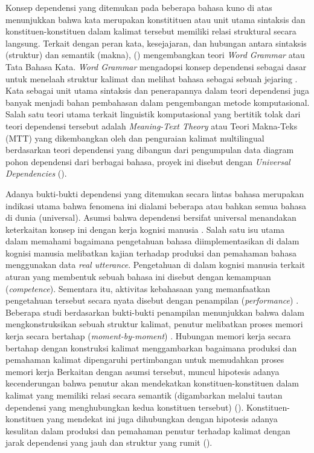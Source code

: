 Konsep dependensi yang ditemukan pada beberapa bahasa kuno di atas menunjukkan bahwa kata merupakan konstitituen atau unit utama sintaksis dan konstituen-konstituen dalam kalimat tersebut memiliki relasi struktural secara langsung. Terkait dengan peran kata, kesejajaran, dan hubungan antara sintaksis (struktur) dan semantik (makna), (\citealp{hudson1984word, hudson2007language}) mengembangkan teori \textit{Word Grammar} atau Tata Bahasa Kata. \textit{Word Grammar} mengadopsi konsep dependensi sebagai dasar untuk menelaah struktur kalimat dan melihat bahasa sebagai sebuah jejaring \citep{hudson2007language}. Kata sebagai unit utama sintaksis dan penerapannya dalam teori dependensi juga banyak menjadi bahan pembahasan dalam pengembangan metode komputasional. Salah satu teori utama terkait linguistik komputasional yang bertitik tolak dari teori dependensi tersebut adalah \textit{Meaning-Text Theory} atau Teori Makna-Teks (MTT) yang dikembangkan oleh \cite{mel'vcuk1988dependency} dan penguraian kalimat multilingual berdasarkan teori dependensi yang dibangun dari pengumpulan data diagram pohon dependensi dari berbagai bahasa, proyek ini disebut dengan \textit{Universal Dependencies} (\citealp{mcdonald2013universal, nivre2016universal, nivre2017universal}). 

Adanya bukti-bukti dependensi yang ditemukan secara lintas bahasa merupakan indikasi utama bahwa fenomena ini dialami beberapa atau bahkan semua bahasa di dunia (universal). Asumsi bahwa dependensi bersifat universal menandakan keterkaitan konsep ini dengan kerja kognisi manusia \citep{gibson2000dependency}. Salah satu isu utama dalam memahami bagaimana pengetahuan bahasa diimplementasikan di dalam kognisi manusia melibatkan kajian terhadap produksi dan pemahaman bahasa menggunakan data \textit{real utterance}. Pengetahuan di dalam kognisi manusia terkait aturan yang membentuk sebuah bahasa ini disebut dengan kemampuan (\textit{competence}). Sementara itu, aktivitas kebahasaan yang memanfaatkan pengetahuan tersebut secara nyata disebut dengan penampilan (\textit{performance}) \citep{delahuntygarvey2010soundsense}. Beberapa studi berdasarkan bukti-bukti penampilan menunjukkan bahwa dalam mengkonstruksikan sebuah struktur kalimat, penutur melibatkan proses memori kerja secara bertahap (\textit{moment-by-moment}) \citep{gibson2000dependency}. Hubungan memori kerja secara bertahap dengan konstruksi kalimat menggambarkan bagaimana produksi dan pemahaman kalimat dipengaruhi pertimbangan untuk memudahkan proses memori kerja \citep{futrell2015large} Berkaitan dengan asumsi tersebut, muncul hipotesis adanya kecenderungan bahwa penutur akan mendekatkan konstituen-konstituen dalam kalimat yang memiliki relasi secara semantik (digambarkan melalui tautan dependensi yang menghubungkan kedua konstituen tersebut) (\citealp{futrell2015large, liu2017dependency}). Konstituen-konstituen yang mendekat ini juga dihubungkan dengan hipotesis adanya kesulitan dalam produksi dan pemahaman penutur terhadap kalimat dengan jarak dependensi yang jauh dan struktur yang rumit (\citealp{gibson2000dependency, dillon2011structured}).

